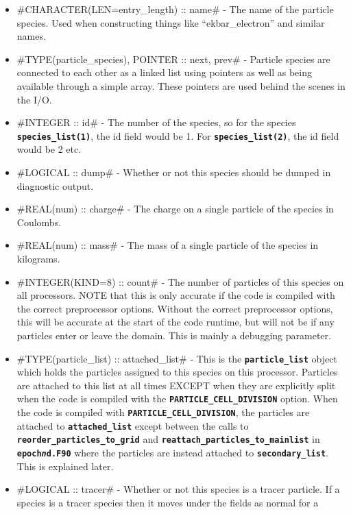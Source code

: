 \documentclass[12pt,a4paper]{article}
\newcommand{\inlinecode}[1]{{\color{warwickred} \bf\texttt{#1}}}
\begin{document}
\begin{itemize}
\item #CHARACTER(LEN=entry_length) :: name# - The name of the particle
  species. Used when constructing things like ``ekbar\_electron'' and similar
  names.
\item #TYPE(particle_species), POINTER :: next, prev# - Particle species are
  connected to each other as a linked list using pointers as well as being
  available through a simple array. These pointers are used behind the scenes
  in the I/O.
\item #INTEGER :: id# - The number of the species, so for the species
  \inlinecode{species\_list(1)}, the id field would be 1. For
  \inlinecode{species\_list(2)}, the id field would be 2 etc.
\item #LOGICAL :: dump# - Whether or not this species should be dumped in
  diagnostic output.
\item #REAL(num) :: charge# - The charge on a single particle of the species in
  Coulombs.
\item #REAL(num) :: mass# - The mass of a single particle of the species in
  kilograms.
\item #INTEGER(KIND=8) :: count# - The number of particles of this species on
  all processors. NOTE that this is only accurate if the code is compiled with
  the correct preprocessor options. Without the correct preprocessor options,
  this will be accurate at the start of the code runtime, but will not be if
  any particles enter or leave the domain. This is mainly a debugging
  parameter.
\item #TYPE(particle_list) :: attached_list# - This is the
  \inlinecode{particle\_list} object which holds the particles assigned to this
  species on this processor. Particles are attached to this list at all
  times EXCEPT when they are explicitly split when the code is
  compiled with the
  \inlinecode{PARTICLE\_CELL\_DIVISION} option. When the code is compiled with
  \inlinecode{PARTICLE\_CELL\_DIVISION}, the particles are attached to
  \inlinecode{attached\_list} except between the calls to
  \inlinecode{reorder\_particles\_to\_grid} and\linebreak
  \inlinecode{reattach\_particles\_to\_mainlist} in
  \inlinecode{epoch{\it n}d.F90} where the particles are instead attached to
  \inlinecode{secondary\_list}. This is explained later.
\item #LOGICAL :: tracer# - Whether or not this species is a tracer particle. If
  a species is a tracer species then it moves under the fields as normal for a

\end{itemize}
\end{document}
